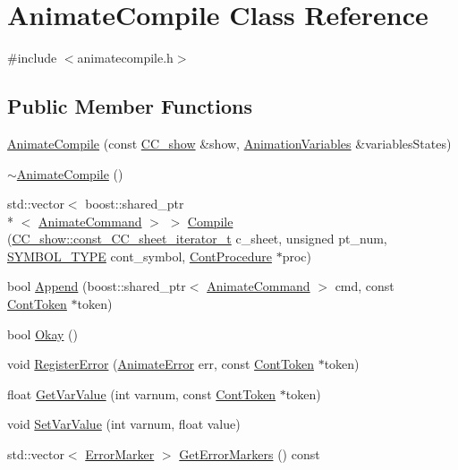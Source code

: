 \hypertarget{a00007}{\section{Animate\-Compile Class Reference}
\label{a00007}
}


{\ttfamily \#include $<$animatecompile.\-h$>$}

\subsection*{Public Member Functions}
\begin{DoxyCompactItemize}
\item 
\hyperlink{a00007_a7b3f8a2ace64c939aa76225984e25c04}{Animate\-Compile} (const \hyperlink{a00046}{C\-C\-\_\-show} \&show, \hyperlink{a00014}{Animation\-Variables} \&variables\-States)
\item 
\hyperlink{a00007_a8a621790c421b2b1ff10a2a8b3f49fab}{$\sim$\-Animate\-Compile} ()
\item 
std\-::vector$<$ boost\-::shared\-\_\-ptr\\*
$<$ \hyperlink{a00003}{Animate\-Command} $>$ $>$ \hyperlink{a00007_a34cceb61b18c2ae436efe5f95becb28a}{Compile} (\hyperlink{a00046_aaaf1345012d2f833d1c8f28f9b8593ff}{C\-C\-\_\-show\-::const\-\_\-\-C\-C\-\_\-sheet\-\_\-iterator\-\_\-t} c\-\_\-sheet, unsigned pt\-\_\-num, \hyperlink{a00216_a68cd84e0300be6f9ff4474682762c9ee}{S\-Y\-M\-B\-O\-L\-\_\-\-T\-Y\-P\-E} cont\-\_\-symbol, \hyperlink{a00067}{Cont\-Procedure} $\ast$proc)
\item 
bool \hyperlink{a00007_a2eab2ee0c43db362a33e54abb941c057}{Append} (boost\-::shared\-\_\-ptr$<$ \hyperlink{a00003}{Animate\-Command} $>$ cmd, const \hyperlink{a00085}{Cont\-Token} $\ast$token)
\item 
bool \hyperlink{a00007_a712b8954d7ef78f56cda0601984986d3}{Okay} ()
\item 
void \hyperlink{a00007_aad974c45b5dac1d240ede102fc664e02}{Register\-Error} (\hyperlink{a00196_a85ee9a09c66824778f4d1e44411f8703}{Animate\-Error} err, const \hyperlink{a00085}{Cont\-Token} $\ast$token)
\item 
float \hyperlink{a00007_a8a1eabe9a7e81917cd67c7c96266dc7e}{Get\-Var\-Value} (int varnum, const \hyperlink{a00085}{Cont\-Token} $\ast$token)
\item 
void \hyperlink{a00007_aa12ee95a9e8e604454ac2ce772cb9c44}{Set\-Var\-Value} (int varnum, float value)
\item 
std\-::vector$<$ \hyperlink{a00098}{Error\-Marker} $>$ \hyperlink{a00007_a1cce4acfa8fd114785068f74def98992}{Get\-Error\-Markers} () const 

\end{DoxyCompactItemize}
